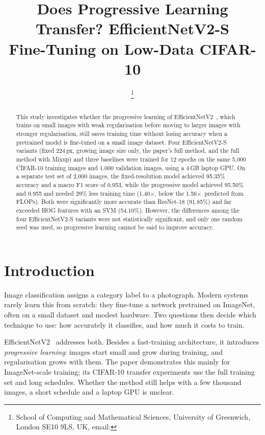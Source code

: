 \documentclass[10pt,twocolumn]{article}
\title{\vspace{-1.2em}\textbf{Does Progressive Learning Transfer? EfficientNetV2-S\\ Fine-Tuning on Low-Data CIFAR-10}\vspace{-0.4em}}
\author{\todo{[Your full name]}\thanks{School of Computing and Mathematical Sciences,
University of Greenwich, London SE10 9LS, UK, email: \todo{[your university email]}}}
\date{\vspace{-1.8em}}
\newcommand{\sx}{$\times$}
\begin{document}
\maketitle

\begin{abstract}
\noindent This study investigates whether the progressive learning of
EfficientNetV2~\cite{tan2021efficientnetv2}, which trains on small images with weak regularisation
before moving to larger images with stronger regularisation, still saves training time without losing
accuracy when a pretrained model is fine-tuned on a small image dataset. Four EfficientNetV2-S variants
(fixed 224\,px, growing image size only, the paper's full method, and the full method with Mixup) and
three baselines were trained for 12 epochs on the same 5{,}000 CIFAR-10 training images and 1{,}000
validation images, using a 4\,GB laptop GPU. On a separate test set of 2{,}000 images, the
fixed-resolution model achieved 95.35\% accuracy and a macro F1 score of 0.953, while the progressive
model achieved 95.50\% and 0.955 and needed 29\% less training time (1.40\sx, below the 1.56\sx\
predicted from FLOPs). Both were significantly more accurate than ResNet-18 (91.85\%) and far exceeded
HOG features with an SVM (54.10\%). However, the differences among the four EfficientNetV2-S variants
were not statistically significant, and only one random seed was used, so progressive learning cannot
be said to improve accuracy.
\end{abstract}

\section{Introduction}
Image classification assigns a category label to a photograph. Modern systems rarely learn this
from scratch: they fine-tune a network pretrained on ImageNet, often on a small dataset and modest
hardware. Two questions then decide which technique to use: how accurately it classifies, and how much
it costs to train.

EfficientNetV2~\cite{tan2021efficientnetv2} addresses both. Besides a fast-training architecture, it
introduces \emph{progressive learning}: images start small and grow during training, and
regularisation grows with them. The paper demonstrates this mainly for ImageNet-scale training; its
CIFAR-10 transfer experiments use the full training set and long schedules. Whether the method still
helps with a few thousand images, a short schedule and a laptop GPU is unclear.
\end{document}
